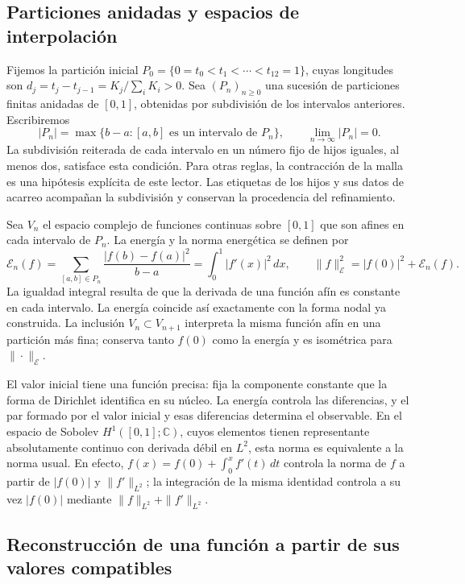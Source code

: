 \documentclass[a4paper,10pt]{article}
\theoremstyle{definition}\newtheorem{definition}[theorem]{Definición}
\theoremstyle{remark}\newtheorem{remark}[theorem]{Observación}
\numberwithin{equation}{section}
\begin{document}
\subsection{Particiones anidadas y espacios de interpolación}

Fijemos la partición inicial
\(P_0=\{0=t_0<t_1<\cdots<t_{12}=1\}\), cuyas longitudes son
\(d_j=t_j-t_{j-1}=K_j/\sum_iK_i>0\). Sea
\((P_n)_{n\geq0}\) una sucesión de particiones finitas anidadas de
\([0,1]\), obtenidas por subdivisión de los intervalos anteriores.
Escribiremos
\[
 |P_n|=\max\{b-a:[a,b]\text{ es un intervalo de }P_n\},
 \qquad \lim_{n\to\infty}|P_n|=0.
\]
La subdivisión reiterada de cada intervalo en un número fijo de hijos
iguales, al menos dos, satisface esta condición. Para otras reglas, la
contracción de la malla es una hipótesis explícita de este lector.
Las etiquetas de los hijos y sus datos de acarreo acompañan la
subdivisión y conservan la procedencia del refinamiento.

Sea \(V_n\) el espacio complejo de funciones continuas sobre \([0,1]\)
que son afines en cada intervalo de \(P_n\). La energía y la norma
energética se definen por
\begin{equation}
 \mathcal E_n(f)
 =\sum_{[a,b]\in P_n}\frac{|f(b)-f(a)|^2}{b-a}
 =\int_0^1|f'(x)|^2\,dx,
 \qquad
 \|f\|_{\mathcal E}^2=|f(0)|^2+\mathcal E_n(f).
 \label{eq:energia-afines-k}
\end{equation}
La igualdad integral resulta de que la derivada de una función afín es
constante en cada intervalo. La energía coincide así exactamente con
la forma nodal ya construida. La inclusión \(V_n\subset V_{n+1}\)
interpreta la misma función afín en una partición más fina; conserva
tanto \(f(0)\) como la energía y es isométrica para
\(\|\cdot\|_{\mathcal E}\).

El valor inicial tiene una función precisa: fija la componente constante
que la forma de Dirichlet identifica en su núcleo. La energía controla
las diferencias, y el par formado por el valor inicial y esas diferencias
determina el observable. En el espacio de Sobolev
\(H^1([0,1];\mathbb C)\), cuyos elementos tienen representante
absolutamente continuo con derivada débil en \(L^2\), esta norma es
equivalente a la norma usual. En efecto,
\(f(x)=f(0)+\int_0^xf'(t)\,dt\) controla la norma de \(f\) a
partir de \(|f(0)|\) y \(\|f'\|_{L^2}\); la integración de la
misma identidad controla a su vez \(|f(0)|\) mediante
\(\|f\|_{L^2}+\|f'\|_{L^2}\).

\subsection{Reconstrucción de una función a partir de sus valores compatibles}
\end{document}
